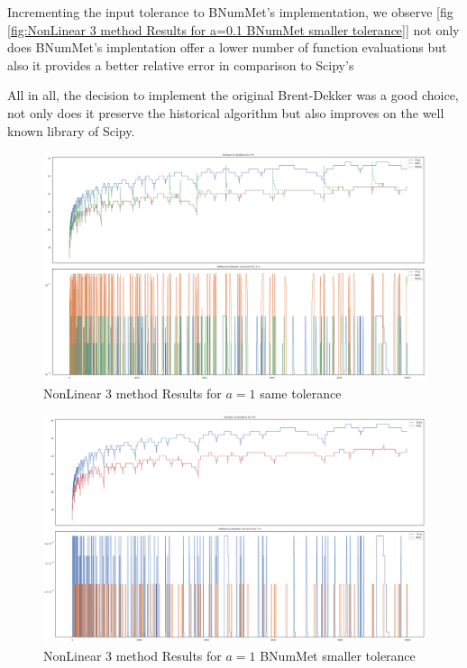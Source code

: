 Incrementing the input tolerance to BNumMet's implementation, we observe [fig \ref{fig:NonLinear 3 method Results for a=0.1 BNumMet smaller tolerance}] not only does BNumMet's implentation offer a lower number of function evaluations but also it provides a better relative error in comparison to Scipy's

All in all, the decision to implement the original Brent-Dekker was a good choice, not only does it preserve the historical algorithm but also improves on the well known library of Scipy.

\begin{figure}
    \centering
    \includegraphics[width=\textwidth]{Include/Images/Thesis/Analysis of Solutions/NonLinear AS/NonLinear 3 method Results a-1.png}
    \caption{NonLinear 3 method Results for $a=1$ same tolerance}
    \label{fig:NonLinear 3 method Results for a=1 same tolerance}
\end{figure}

\begin{figure}
    \centering
    \includegraphics[width=\textwidth]{Include/Images/Thesis/Analysis of Solutions/NonLinear AS/NonLinear 3 method Results Small Tol Bnum a-1.png}
    \caption{NonLinear 3 method Results for $a=1$ BNumMet smaller tolerance}
    \label{fig:NonLinear 3 method Results for a=1 BNumMet smaller tolerance}
\end{figure}

